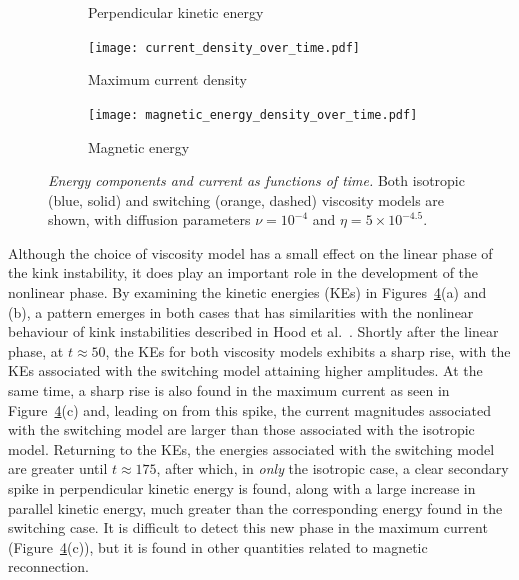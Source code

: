 \begin{figure}[t]
\begin{subfigure}[t]{0.49\textwidth}
      \caption{Perpendicular kinetic energy}
      \label{fig:perp_kinetic_energy_over_time}
    \end{subfigure}
    \begin{subfigure}[t]{0.49\textwidth}
      \centering
      \texttt{[image: current\_density\_over\_time.pdf]}
      \caption{Maximum current density}
      \label{fig:current_density_over_time}
    \end{subfigure}
    \begin{subfigure}[t]{0.49\textwidth}
      \centering
      \texttt{[image: magnetic\_energy\_density\_over\_time.pdf]}
      \caption{Magnetic energy}
      \label{fig:magnetic_energy_density_over_time}
    \end{subfigure}
    \caption{\textit{Energy components and current as functions of time.} Both isotropic (blue, solid) and switching (orange, dashed) viscosity models are shown, with diffusion parameters $\nu = 10^{-4}$ and $\eta = 5\times 10^{-4.5}$.}
    \label{fig:energies}
\end{figure}

Although the choice of viscosity model has a small effect on the
linear phase of the kink instability, it does play an important role
in the development of the nonlinear phase. By examining the kinetic
energies (KEs) in Figures~\ref{fig:energies}(a) and (b), a pattern
emerges in both cases that has similarities with the nonlinear
  behaviour of kink instabilities described in Hood et
al.~\cite{hoodCoronalHeatingMagnetic2009}. Shortly after the linear
phase, at $t\approx50$, the KEs for both viscosity models
exhibits a sharp rise, with the KEs associated with the switching
model attaining higher amplitudes. At the same time, a sharp rise is
also found in the maximum current as seen in
Figure~\ref{fig:energies}(c) and, leading on from this spike, the
current magnitudes associated with the switching model are larger than
those associated with the isotropic model. Returning to the KEs, the
energies associated with the switching model are greater until
$t\approx175$, after which, in \emph{only} the isotropic case, 
a clear secondary spike in perpendicular kinetic energy is found, along with a large
increase in parallel kinetic energy, much greater than the corresponding energy
found in the switching case. It is difficult to detect this new phase
in the maximum current (Figure~\ref{fig:energies}(c)), but it is found
in other quantities related to magnetic reconnection. 

